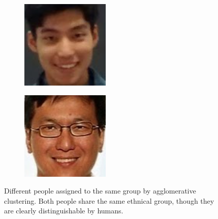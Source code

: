 \documentclass[conference]{IEEEtran}
\begin{document}
\begin{figure}
  \centering
  \begin{subfigure}[b]{0.2\textwidth}
    \includegraphics[width=\linewidth]{wrong_ethnical_a}
  \end{subfigure}
  \begin{subfigure}[b]{0.2\textwidth}
    \includegraphics[width=\linewidth]{wrong_ethnical_b}
  \end{subfigure}
  \caption{Different people assigned to the same group by agglomerative clustering. Both people share the same ethnical group, though they are clearly distinguishable by humans.}
  \label{wrong_ethnical}
\end{figure}
\end{document}
